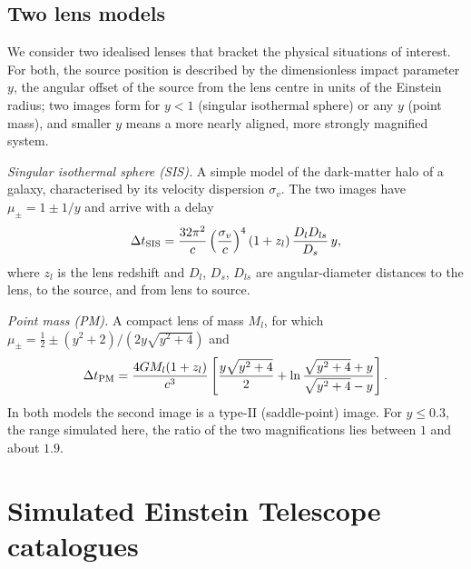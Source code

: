 \documentclass[aps,prd,twocolumn,superscriptaddress,nofootinbib,floatfix]{revtex4-2}
\begin{document}
\subsection{Two lens models}

We consider two idealised lenses that bracket the physical situations of interest.
For both, the source position is described by the dimensionless impact parameter $y$, the angular offset of the source from the lens centre in units of the Einstein radius; two images form for $y<1$ (singular isothermal sphere) or any $y$ (point mass), and smaller $y$ means a more nearly aligned, more strongly magnified system.

\emph{Singular isothermal sphere (SIS).}
A simple model of the dark-matter halo of a galaxy, characterised by its velocity dispersion $\sigma_v$.
The two images have $\mu_\pm = 1\pm 1/y$ and arrive with a delay~\cite{NarayanBartelmann}
\begin{equation}
\Delta t_{\rm SIS} = \frac{32\pi^2}{c}\left(\frac{\sigma_v}{c}\right)^{4}(1+z_l)\,\frac{D_l D_{ls}}{D_s}\,y,
\label{eq:sis}
\end{equation}
where $z_l$ is the lens redshift and $D_l$, $D_s$, $D_{ls}$ are angular-diameter distances to the lens, to the source, and from lens to source.

\emph{Point mass (PM).}
A compact lens of mass $M_l$, for which $\mu_\pm = \tfrac12 \pm (y^2+2)/(2y\sqrt{y^2+4})$ and
\begin{equation}
\Delta t_{\rm PM} = \frac{4GM_l(1+z_l)}{c^3}\left[\frac{y\sqrt{y^2+4}}{2} + \ln\frac{\sqrt{y^2+4}+y}{\sqrt{y^2+4}-y}\right].
\label{eq:pm}
\end{equation}
In both models the second image is a type-II (saddle-point) image.
For $y\le 0.3$, the range simulated here, the ratio of the two magnifications lies between $1$ and about $1.9$.

\section{Simulated Einstein Telescope catalogues}
\label{sec:sims}
\end{document}
